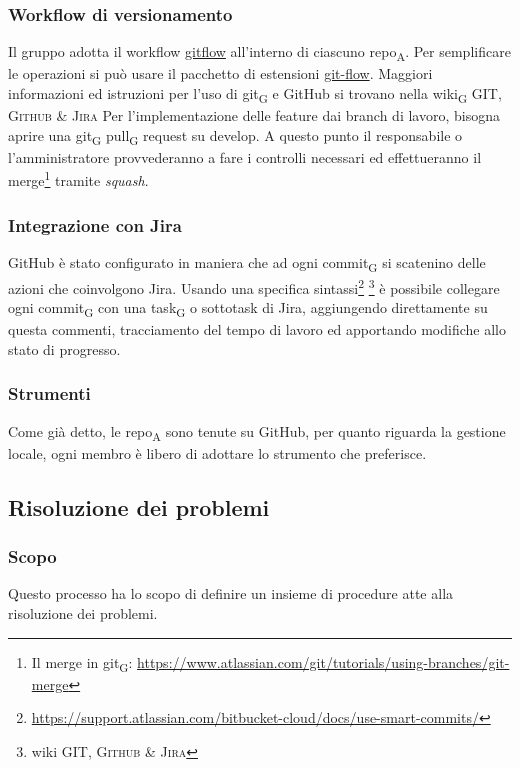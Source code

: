     \subsubsection{Workflow di versionamento}
        Il gruppo adotta il workflow \href{https://www.atlassian.com/git/tutorials/comparing-workflows/gitflow-workflow}{gitflow} all'interno di ciascuno repo\textsubscript{A}. Per semplificare le operazioni si può usare il pacchetto di estensioni \href{http://danielkummer.github.io/git-flow-cheatsheet/}{git-flow}. Maggiori informazioni ed istruzioni per l'uso di git\textsubscript{G} e GitHub si trovano nella wiki\textsubscript{G} \textsc{GIT, Github \& Jira}
            Per l'implementazione delle feature dai branch di lavoro, bisogna aprire una git\textsubscript{G} pull\textsubscript{G} request su develop. A questo punto il responsabile o l'amministratore provvederanno a fare i controlli necessari ed effettueranno il merge\footnote{Il merge in git\textsubscript{G}: \url{https://www.atlassian.com/git/tutorials/using-branches/git-merge}} tramite \textit{squash}.

    \subsubsection{Integrazione con Jira}
    \label{jiraintegration}
        GitHub è stato configurato in maniera che ad ogni commit\textsubscript{G} si scatenino delle azioni che coinvolgono Jira. Usando una specifica sintassi\footnote{\url{https://support.atlassian.com/bitbucket-cloud/docs/use-smart-commits/}} \footnote{wiki \textsc{GIT, Github \& Jira}} è possibile collegare ogni commit\textsubscript{G} con una task\textsubscript{G} o sottotask di Jira, aggiungendo direttamente su questa commenti, tracciamento del tempo di lavoro ed apportando modifiche allo stato di progresso.

    \subsubsection{Strumenti}
    Come già detto, le repo\textsubscript{A} sono tenute su GitHub, per quanto riguarda la gestione locale, ogni membro è libero di adottare lo strumento che preferisce.


\subsection{Risoluzione dei problemi}
    \label{risoluzioneproblemi}
    \subsubsection{Scopo}
        Questo processo ha lo scopo di definire un insieme di procedure atte alla risoluzione dei problemi.
